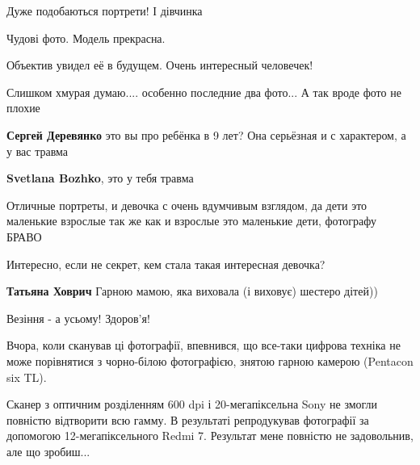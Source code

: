  
 
 
 
 
\zzSecCmt

\begin{itemize} %
Дуже подобаються портрети! І дівчинка

Чудові фото. Модель прекрасна.

Объектив увидел её в будущем. Очень интересный человечек!

Слишком хмурая думаю.... особенно последние два фото... А так вроде фото не
плохие

\begin{itemize} %
\textbf{Сергей Деревянко} это вы про ребёнка в 9 лет? Она серьёзная и с характером, а у вас травма

\textbf{Svetlana Bozhko}, это у тебя травма
\end{itemize} %


Отличные портреты, и девочка с очень вдумчивым взглядом, да дети это маленькие
взрослые так же как и взрослые это маленькие дети, фотографу БРАВО


Интересно, если не секрет, кем стала такая интересная девочка?

\begin{itemize} %
\textbf{Татьяна Ховрич} Гарною мамою, яка виховала (і виховує) шестеро дітей))

Везіння - а усьому! Здоров'я!
\end{itemize} %


Вчора, коли сканував ці фотографії, впевнився, що все-таки цифрова техніка не
може порівнятися з чорно-білою фотографією, знятою гарною камерою (Pentacon six
TL).

Сканер з оптичним розділенням 600 dpi і 20-мегапіксельна Sony не змогли
повністю відтворити всю гамму. В результаті репродукував фотографії за
допомогою 12-мегапіксельного Redmi 7. Результат мене повністю не задовольнив,
але що зробиш...


\end{itemize}
